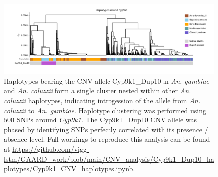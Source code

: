 \documentclass[a4paper,12pt]{article}
\begin{document}
\clearpage

\begin{figure}[h]
	\includegraphics*[width = 17cm]{../../CNV_analysis/Cyp9k1_Dup10_haplotypes/Cyp9k1_haplotype_clustering.png}
	\caption{\footnotesize Haplotypes bearing the CNV allele Cyp9k1\_Dup10 in \textit{An. gambiae} and \textit{An. coluzzii} form a single cluster nested within other \textit{An. coluzzii} haplotypes, indicating introgession of the allele from \textit{An. coluzzii} to \textit{An. gambiae}. Haplotype clustering was performed using 500 SNPs around \textit{Cyp9k1}. The Cyp9k1\_Dup10 CNV allele was phased by identifying SNPs perfectly correlated with its presence / absence level. Full workings to reproduce this analysis can be found at \url{https://github.com/vigg-lstm/GAARD\_work/blob/main/CNV\_analysis/Cyp9k1\_Dup10\_haplotypes/Cyp9k1\_CNV\_haplotypes.ipynb}.}
	\label{FigS6}
\end{figure}
\end{document}
